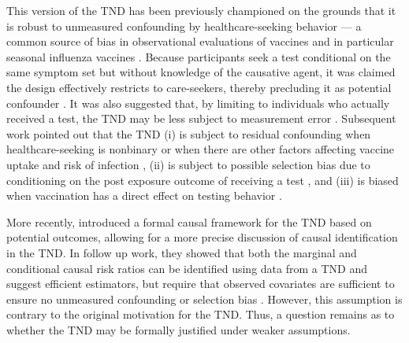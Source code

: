 \documentclass[11pt]{article}
\begin{document}
This version of the TND has been previously championed on the grounds that it is robust to unmeasured confounding by healthcare-seeking behavior  --- a common source of bias in observational evaluations of vaccines and in particular seasonal influenza vaccines \cite{jackson_test-negative_2013}. Because participants seek a test conditional on the same symptom set but without knowledge of the causative agent, it was claimed the design effectively restricts to care-seekers, thereby precluding it as potential confounder \cite{jackson_test-negative_2013}. It was also suggested that, by limiting to individuals who actually received a test, the TND may be less subject to measurement error \cite{jackson_test-negative_2013}. Subsequent work pointed out that the TND (i) is subject to residual confounding when healthcare-seeking is nonbinary or when there are other factors affecting vaccine uptake and risk of infection \cite{sullivan_theoretical_2016,lewnard_theoretical_2021,lipsitch_observational_2016}, (ii) is subject to possible selection bias due to conditioning on the post exposure outcome of receiving a test \cite{sullivan_theoretical_2016,lipsitch_observational_2016}, and (iii) is biased when vaccination has a direct effect on testing behavior \cite{foppa_case_2013}. 

More recently, \textcite{schnitzer_estimands_2022} introduced a formal causal framework for the TND based on potential outcomes, allowing for a more precise discussion of causal identification in the TND. In follow up work, they showed that both the marginal and conditional causal risk ratios can be identified using data from a TND and suggest efficient estimators, but require that observed covariates are sufficient to ensure no unmeasured confounding or selection bias \cite{jiang_tnddr_2023}. However, this assumption is contrary to the original motivation for the TND. Thus, a question remains as to whether the TND may be formally justified under weaker assumptions.
\end{document}

